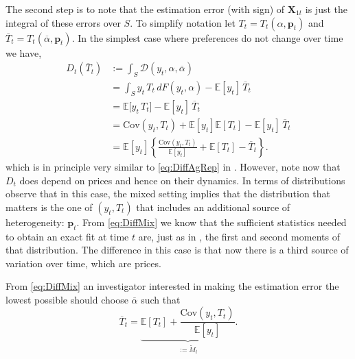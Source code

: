\documentclass[english, a4paper,12pt]{article}
\begin{document}
The second step is to note that the estimation error (with sign) of $\mathbf{X}_{1t}$ is just the integral of these errors over $S$. To simplify notation let $T_{t} = T_{t}(\alpha , \mathbf{p}_{t})$ and $\overline{T}_{t} = T_{t}(\overline{\alpha}, \mathbf{p}_{t})$. In the simplest case where preferences do not change over time we have,
	\begin{equation} \label{eq:DiffMix}
	\begin{aligned} 
		D_{t}\left(\overline{T}_{t}\right)
			&:=	\int_{S} \mathcal{D}(y_{t},\alpha,\overline{\alpha})	\\
			&=	\int_{S} y_{t}\,T_{t} \, dF(y_{t},\alpha) - \mathbb{E}[y_{t}]\, \overline{T}_{t}	\\
			&=	\mathbb{E}\big[y_{t} \, T_{t}\big] - \mathbb{E}[y_{t}]\, \overline{T}_{t}		\\
			&=	\mathrm{Cov}\left(y_{t}, T_{t} \right) + \mathbb{E}[y_{t}]\mathbb{E}\left[T_{t}\right] - \mathbb{E}[y_{t}]\, \overline{T}_{t}	\\
			&= 	\mathbb{E}[y_{t}]\left\{ \frac{\mathrm{Cov}\left(y_{t}, T_{t} \right)}{\mathbb{E}[y_{t}]} + \mathbb{E}\left[T_{t}\right] - \overline{T}_{t} \right\}.
	\end{aligned}
	\end{equation}
which is in principle very similar to \eqref{eq:DiffAgRep} in . However, note now that $D_{t}$ does depend on prices and hence on their dynamics. In terms of distributions observe that in this case, the mixed setting implies that the distribution that matters is the one of $(y_{t},T_{t})$ that includes an additional source of heterogeneity: $\mathbf{p}_{t}$. From \eqref{eq:DiffMix} we know that the sufficient statistics needed to obtain an exact fit at time $t$ are, just as in , the first and second moments of that distribution. The difference in this case is that now there is a third source of variation over time, which are prices.


From \eqref{eq:DiffMix} an investigator interested in making the estimation error the lowest possible should choose $\overline{\alpha}$ such that
	\begin{equation} \label{eq:OptT}
		\overline{T}_{t} =  \underbrace{\mathbb{E}\left[T_{t} \right] + \frac{\mathrm{Cov}\left(y_{t}, T_{t} \right)}{\mathbb{E}[y_{t}]}}_{:= \tilde{M}_{t}}.
	\end{equation}
\end{document}
